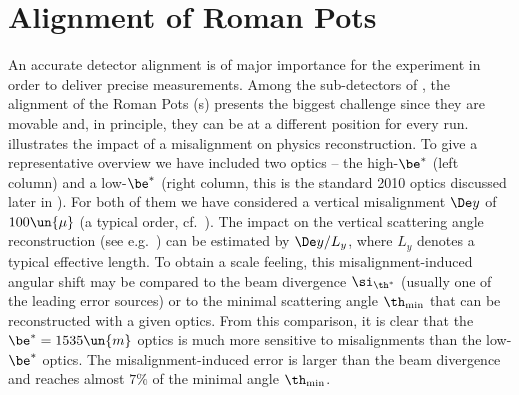 \chapter[al]{Alignment of Roman Pots}


An accurate detector alignment is of major importance for the  experiment in order to deliver precise measurements. Among the sub-detectors of , the alignment of the Roman Pots (s) presents the biggest challenge since they are movable and, in principle, they can be at a different position for every run.  illustrates the impact of a misalignment on physics reconstruction. To give a representative overview we have included two optics -- the high-$\be^*$ (left column) and a low-$\be^*$ (right column, this is the standard 2010  optics discussed later in ). For both of them we have considered a vertical misalignment $\De y$ of $100\un{\mu}$ (a typical order, cf.~). The impact on the vertical scattering angle reconstruction (see e.g.~) can be estimated by $\De y/L_y$, where $L_y$ denotes a typical effective length. To obtain a scale feeling, this misalignment-induced angular shift may be compared to the beam divergence $\si_{\th^*}$ (usually one of the leading error sources) or to the minimal scattering angle $\th_{\rm min}$ that can be reconstructed with a given optics. From this comparison, it is clear that the $\be^* = 1535\un{m}$ optics is much more sensitive to misalignments than the low-$\be^*$ optics. The misalignment-induced error is larger than the beam divergence and reaches almost $7\percent$ of the minimal angle $\th_{\rm min}$.


